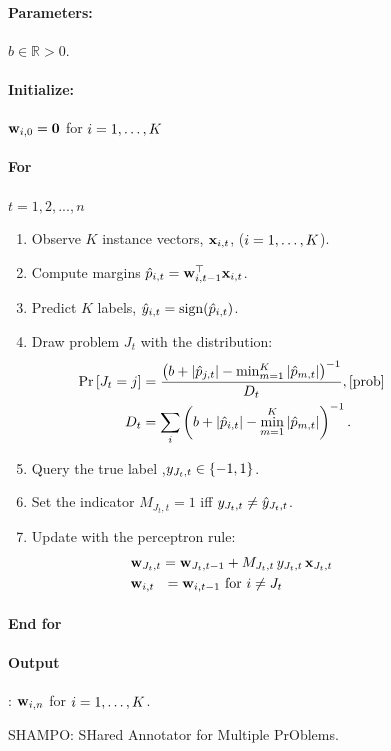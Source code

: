 \label{sec:alg}
\begin{figure}[t]
\paragraph{Parameters:}$b\in\mathbb{R}>0$.
\paragraph{Initialize:} $\mathbf{w}_{i,0}={\boldsymbol{0}}$ for $i=1, \ldots , K$
\paragraph{For}  {$t=1,2, ..., n$} 
\begin{enumerate}
\nolineskips
\item Observe $K$ instance vectors, $\mathbf{x}_{i,t}$, ($i=1 , \ldots , K$).
\item Compute margins $\hat{p}_{i,t}={\mathbf{w}}^{\top}_{i,t-1} \mathbf{x}_{i,t}$.
\item Predict $K$ labels, $\hat{y}_{i,t}={\rm sign}(\hat{p}_{i,t})$.
\item Draw problem $J_t$  with the distribution:
\begin{align}
\pr{J_t=j} &=
\frac{\paren{b+\abs{\hat{p}_{j,t}}-\min_{m=1}^K\abs{\hat{p}_{m,t}}}^{-1}}{D_{t}}, \eqref{prob}\nonumber\\
D_t &=
\sum_i \paren{b+\abs{\hat{p}_{i,t}}-\min_{m=1}^K\abs{\hat{p}_{m,t}}}^{-1}. \nonumber
\end{align}
\item Query the true label ,$y_{J_t,t}\in\{-1,1\}$.
\item Set the indicator $M_{J_t, t}=1$ iff $y_{J_t,t} \neq \hat{y}_{J_t,t}$.
\item Update with the perceptron rule:
\begin{align}
&\mathbf{w}_{J_t,t} = \mathbf{w}_{J_t,t-1}+M_{J_t,t} \, y_{J_t,t}\, \mathbf{x}_{J_t,t} \label{perc_update}\\
&\mathbf{w}_{i,t} ~~= \mathbf{w}_{i,t-1}  \textrm{ for } i \neq J_t \nonumber
\end{align}
\end{enumerate}
\paragraph{End for} 
\paragraph{Output}: $\mathbf{w}_{i,n}$ for $i=1 , \ldots , K$.
\caption{SHAMPO: SHared Annotator for Multiple PrOblems. \label{alg:SHAMPO_FO}}
\end{figure}        




